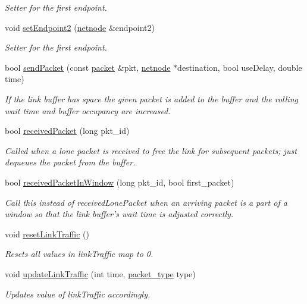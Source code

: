 \begin{DoxyCompactItemize}
\begin{DoxyCompactList}\small\item\em Setter for the first endpoint. \end{DoxyCompactList}\item 
void \hyperlink{classnetlink_a3e919ef44ab61692e5ff8af9bc08199d}{set\-Endpoint2} (\hyperlink{classnetnode}{netnode} \&endpoint2)
\begin{DoxyCompactList}\small\item\em Setter for the first endpoint. \end{DoxyCompactList}\item 
bool \hyperlink{classnetlink_ac0ccebbeb83abdbdc73533c29897250e}{send\-Packet} (const \hyperlink{classpacket}{packet} \&pkt, \hyperlink{classnetnode}{netnode} $\ast$destination, bool use\-Delay, double time)
\begin{DoxyCompactList}\small\item\em If the link buffer has space the given packet is added to the buffer and the rolling wait time and buffer occupancy are increased. \end{DoxyCompactList}\item 
bool \hyperlink{classnetlink_ad2f5311a0a1f6f0afc3667f3e1f1c0fe}{received\-Packet} (long pkt\-\_\-id)
\begin{DoxyCompactList}\small\item\em Called when a lone packet is received to free the link for subsequent packets; just dequeues the packet from the buffer. \end{DoxyCompactList}\item 
bool \hyperlink{classnetlink_ac345307525d371f1093b71d53665b8b7}{received\-Packet\-In\-Window} (long pkt\-\_\-id, bool first\-\_\-packet)
\begin{DoxyCompactList}\small\item\em Call this instead of {\ttfamily received\-Lone\-Packet} when an arriving packet is a part of a window so that the link buffer's wait time is adjusted correctly. \end{DoxyCompactList}\item 
\hypertarget{classnetlink_a354a84d64f26b8e1c811cac076967a4f}{void \hyperlink{classnetlink_a354a84d64f26b8e1c811cac076967a4f}{reset\-Link\-Traffic} ()}\label{classnetlink_a354a84d64f26b8e1c811cac076967a4f}

\begin{DoxyCompactList}\small\item\em Resets all values in link\-Traffic map to 0. \end{DoxyCompactList}\item 
void \hyperlink{classnetlink_a5100639202ca31e9459431e936ce5424}{update\-Link\-Traffic} (int time, \hyperlink{util_8h_ad875bcb78f9bd8625c5e454cafdc8de7}{packet\-\_\-type} type)
\begin{DoxyCompactList}\small\item\em Updates value of link\-Traffic accordingly. \end{DoxyCompactList}\end{DoxyCompactItemize}



